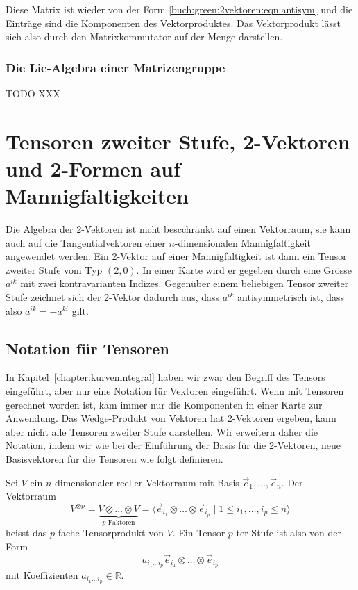 Diese Matrix ist wieder von der Form 
\eqref{buch:green:2vektoren:eqn:antisym}
und die Einträge sind die Komponenten des Vektorproduktes.
Das Vektorprodukt lässt sich also durch den Matrixkommutator
auf der Menge darstellen.

\subsubsection{Die Lie-Algebra einer Matrizengruppe}
TODO XXX

%
%
\section{Tensoren zweiter Stufe, 2-Vektoren und 2-Formen auf Mannigfaltigkeiten
\label{buch:green:section:2formen}}
Die Algebra der 2-Vektoren ist nicht bescchränkt auf einen Vektorraum,
sie kann auch auf die Tangentialvektoren einer $n$-dimensionalen
Mannigfaltigkeit angewendet werden.
Ein 2-Vektor auf einer Mannigfaltigkeit ist dann ein Tensor zweiter
Stufe vom Typ $(2,0)$.
In einer Karte wird er gegeben durch eine Grösse $a^{ik}$ mit zwei
kontravarianten Indizes.
Gegenüber einem beliebigen Tensor zweiter Stufe zeichnet sich der 
2-Vektor dadurch aus, dass $a^{ik}$ antisymmetrisch ist, dass also
$a^{ik}=-a^{ki}$ gilt.

%
%
\subsection{Notation für Tensoren}
In Kapitel~\ref{chapter:kurvenintegral} haben wir zwar den Begriff des
Tensors eingeführt, aber nur eine Notation für Vektoren eingeführt.
Wenn mit Tensoren gerechnet worden ist, kam immer nur die Komponenten
in einer Karte zur Anwendung.
Das Wedge-Produkt von Vektoren hat 2-Vektoren ergeben, kann aber
nicht alle Tensoren zweiter Stufe darstellen.
Wir erweitern daher die Notation, indem wir wie bei der Einführung der
Basis für die 2-Vektoren, neue Basisvektoren für die Tensoren wie 
folgt definieren.

\begin{definition}
\label{buch:green:tensoren:definition:tensorprodukt}
Sei $V$ ein $n$-dimensionaler reeller Vektorraum mit Basis
$\vec{e}_1,\dots,\vec{e}_n$.
Der Vektorraum
\[
V^{\otimes p}
=
\underbrace{
V\otimes\dots\otimes V
}_{\displaystyle \text{$p$ Faktoren}}
=
\langle \vec{e}_{i_1}\otimes\dots\otimes \vec{e}_{i_p}
\mid
1\le 
i_1,\dots,i_p
\le n
\rangle
\]
heisst das $p$-fache Tensorprodukt von $V$.
Ein Tensor $p$-ter Stufe ist also von der Form
\[
a_{i_1\dots i_p}\vec{e}_{i_1}\otimes\dots\otimes\vec{e}_{i_p}
\]
mit Koeffizienten $a_{i_1\dots i_p}\in\mathbb{R}$.
\end{definition}

